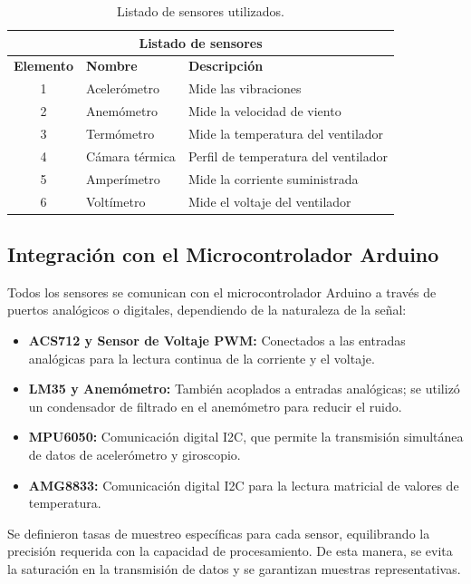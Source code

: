 \begin{table}[H]
    \centering
    \caption{Listado de sensores utilizados.}
    \begin{tabular}{|c|l|l|}
    \hline
    \multicolumn{3}{|c|}{\textbf{Listado de sensores}} \\
    \hline
    \textbf{Elemento} & \textbf{Nombre}       & \textbf{Descripción}                          \\
    \hline
    1 & Acelerómetro      & Mide las vibraciones                       \\
    2 & Anemómetro        & Mide la velocidad de viento               \\
    3 & Termómetro        & Mide la temperatura del ventilador        \\
    4 & Cámara térmica    & Perfil de temperatura del ventilador      \\
    5 & Amperímetro       & Mide la corriente suministrada            \\
    6 & Voltímetro        & Mide el voltaje del ventilador            \\
    \hline
    \end{tabular}
    \label{tab:senso}
    \end{table}
    
\subsection{Integración con el Microcontrolador Arduino}
Todos los sensores se comunican con el microcontrolador Arduino a través de puertos analógicos o digitales, dependiendo de la naturaleza de la señal:
\begin{itemize}
    \item \textbf{ACS712 y Sensor de Voltaje PWM:} Conectados a las entradas analógicas para la lectura continua de la corriente y el voltaje.
    \item \textbf{LM35 y Anemómetro:} También acoplados a entradas analógicas; se utilizó un condensador de filtrado en el anemómetro para reducir el ruido.
    \item \textbf{MPU6050:} Comunicación digital I2C, que permite la transmisión simultánea de datos de acelerómetro y giroscopio.
    \item \textbf{AMG8833:} Comunicación digital I2C para la lectura matricial de valores de temperatura.
\end{itemize}

Se definieron tasas de muestreo específicas para cada sensor, equilibrando la precisión requerida con la capacidad de procesamiento. De esta manera, se evita la saturación en la transmisión de datos y se garantizan muestras representativas.

